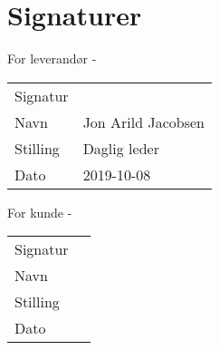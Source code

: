 \section{Signaturer}





\begin{center}
For leverandør - \suppliername
\vspace{1cm}

\begin{tabu} to 0.75\textwidth {  X[l]  X[l]  }

 Signatur & \hrulefill  \\ 
 Navn & Jon Arild Jacobsen  \\ 
 Stilling & Daglig leder  \\ 
 Dato & 2019-10-08  \\ 

\end{tabu}
\end{center}

\vspace{2cm}


\begin{center}
For kunde - \customername	
\vspace{1cm}

 \begin{tabu} to 0.75\textwidth {  X[l]  X[l]  }
 Signatur &  \hrulefill \\ 
 Navn & \hrulefill  \\ 
 Stilling & \hrulefill  \\ 
 Dato & \hrulefill  \\ 
 \end{tabu}

\end{center}